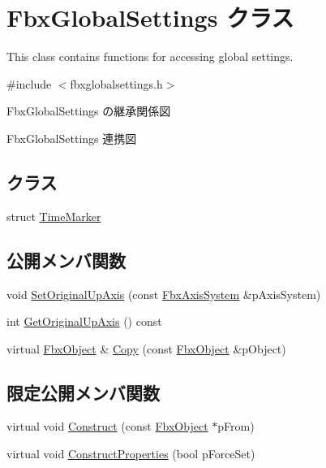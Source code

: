 \hypertarget{class_fbx_global_settings}{}\section{Fbx\+Global\+Settings クラス}
\label{class_fbx_global_settings}


This class contains functions for accessing global settings.  




{\ttfamily \#include $<$fbxglobalsettings.\+h$>$}



Fbx\+Global\+Settings の継承関係図


Fbx\+Global\+Settings 連携図
\subsection*{クラス}
\begin{DoxyCompactItemize}
\item 
struct \hyperlink{struct_fbx_global_settings_1_1_time_marker}{Time\+Marker}
\end{DoxyCompactItemize}
\subsection*{公開メンバ関数}
\begin{DoxyCompactItemize}
\item 
void \hyperlink{class_fbx_global_settings_af82679ae7c4df3249e547f6d18be9c19}{Set\+Original\+Up\+Axis} (const \hyperlink{class_fbx_axis_system}{Fbx\+Axis\+System} \&p\+Axis\+System)
\item 
int \hyperlink{class_fbx_global_settings_a6d55cf87bc48c0746c28b4d421db6381}{Get\+Original\+Up\+Axis} () const
\item 
virtual \hyperlink{class_fbx_object}{Fbx\+Object} \& \hyperlink{class_fbx_global_settings_aa44ceae4a448e0abd0b17b869f328e2f}{Copy} (const \hyperlink{class_fbx_object}{Fbx\+Object} \&p\+Object)
\end{DoxyCompactItemize}
\subsection*{限定公開メンバ関数}
\begin{DoxyCompactItemize}
\item 
virtual void \hyperlink{class_fbx_global_settings_a81b462c1a0102da73f5d3678ed85d7c9}{Construct} (const \hyperlink{class_fbx_object}{Fbx\+Object} $\ast$p\+From)
\item 
virtual void \hyperlink{class_fbx_global_settings_a68f3fbfa989be5e5f37040c7a780232b}{Construct\+Properties} (bool p\+Force\+Set)
\end{DoxyCompactItemize}
